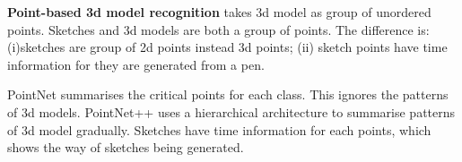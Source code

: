 \textbf{Point-based 3d model recognition} takes 3d model as group of unordered points. Sketches and 3d models are both a group of points. The difference is: (i)sketches are group of 2d points instead 3d points; (ii) sketch points have time information for they are generated from a pen.

PointNet \cite{qi2017pointnet} summarises the critical points for each class. This ignores the patterns of 3d models. PointNet++ \cite{qi2017pointnetplusplus} uses a hierarchical architecture to summarise patterns of 3d model gradually. Sketches have time information for each points, which shows the way of sketches being generated.
